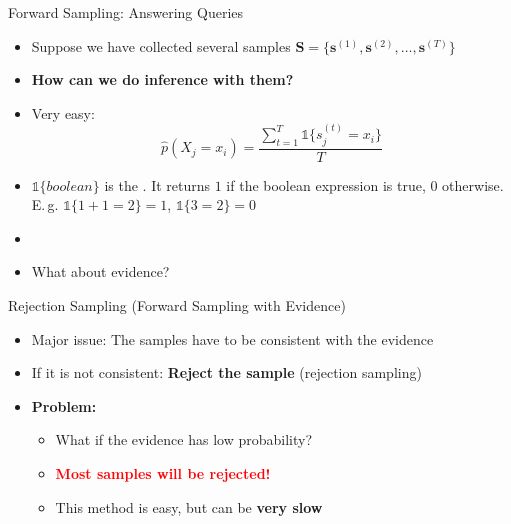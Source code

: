 \begin{frame}{Forward Sampling: Answering Queries}{}
	\begin{itemize}
		\item Suppose we have collected several samples
			$\bm{S} = \{ \bm{s}^{(1)}, \bm{s}^{(2)}, \dots, \bm{s}^{(T)} \}$
		\item \textbf{How can we do inference with them?}
		\item Very easy:
		\begin{equation*}
			\widehat{p}(X_j = x_i) = \frac{\sum_{t=1}^T \mathbb{1}\{ s_j^{(t)} = x_i \}}{T}
		\end{equation*}
		\item $\mathbb{1}\{ boolean \}$ is the .
			It returns $1$ if the boolean expression is true, $0$ otherwise.
			E.\,g. $\mathbb{1}\{1+1=2\} = 1$, $\mathbb{1}\{3=2\} = 0$
		\item {}
		\item What about evidence?
	\end{itemize}
\end{frame}


\begin{frame}{Rejection Sampling (Forward Sampling with Evidence)}{}
	\begin{itemize}
		\item Major issue: The samples have to be consistent with the evidence
		\item If it is not consistent: \textbf{Reject the sample} (rejection sampling)
		\item \textbf{Problem:}
		\begin{itemize}
			\item What if the evidence has low probability?
			\item \textcolor{red}{\textbf{Most samples will be rejected!}}
			\item This method is easy, but can be \textbf{very slow}
		\end{itemize}
	\end{itemize}
\end{frame}


